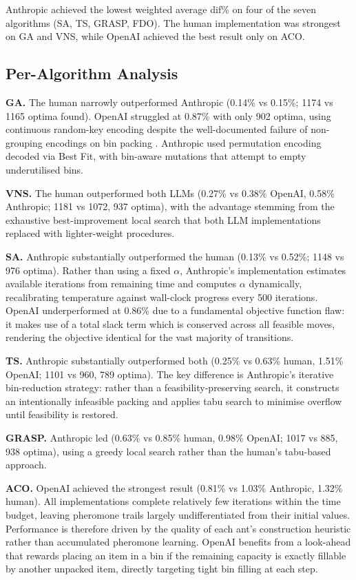 \documentclass[11pt]{article}
\begin{document}
Anthropic achieved the lowest weighted average dif\% on four of the seven algorithms (SA, TS, GRASP, FDO). The human implementation was strongest on GA and VNS, while OpenAI achieved the best result only on ACO.

\subsection{Per-Algorithm Analysis}

\textbf{GA.} The human narrowly outperformed Anthropic (0.14\% vs 0.15\%; 1174 vs 1165 optima found). OpenAI struggled at 0.87\% with only 902 optima, using continuous random-key encoding despite the well-documented failure of non-grouping encodings on bin packing \cite{gga}. Anthropic used permutation encoding decoded via Best Fit, with bin-aware mutations that attempt to empty underutilised bins.

\textbf{VNS.} The human outperformed both LLMs (0.27\% vs 0.38\% OpenAI, 0.58\% Anthropic; 1181 vs 1072, 937 optima), with the advantage stemming from the exhaustive best-improvement local search that both LLM implementations replaced with lighter-weight procedures.

\textbf{SA.} Anthropic substantially outperformed the human (0.13\% vs 0.52\%; 1148 vs 976 optima). Rather than using a fixed $\alpha$, Anthropic's implementation estimates available iterations from remaining time and computes $\alpha$ dynamically, recalibrating temperature against wall-clock progress every 500 iterations. OpenAI underperformed at 0.86\% due to a fundamental objective function flaw: it makes use of a total slack term which is conserved across all feasible moves, rendering the objective identical for the vast majority of transitions.

\textbf{TS.} Anthropic substantially outperformed both (0.25\% vs 0.63\% human, 1.51\% OpenAI; 1101 vs 960, 789 optima). The key difference is Anthropic's iterative bin-reduction strategy: rather than a feasibility-preserving search, it constructs an intentionally infeasible packing and applies tabu search to minimise overflow until feasibility is restored.

\textbf{GRASP.} Anthropic led (0.63\% vs 0.85\% human, 0.98\% OpenAI; 1017 vs 885, 938 optima), using a greedy local search rather than the human's tabu-based approach.

\textbf{ACO.} OpenAI achieved the strongest result (0.81\% vs 1.03\% Anthropic, 1.32\% human). All implementations complete relatively few iterations within the time budget, leaving pheromone trails largely undifferentiated from their initial values. Performance is therefore driven by the quality of each ant's construction heuristic rather than accumulated pheromone learning. OpenAI benefits from a look-ahead that rewards placing an item in a bin if the remaining capacity is exactly fillable by another unpacked item, directly targeting tight bin filling at each step.
\end{document}
